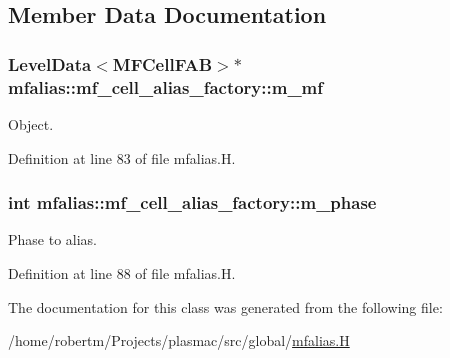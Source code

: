 \subsection{Member Data Documentation}
\subsubsection[{\texorpdfstring{m\+\_\+mf}{m_mf}}]{\setlength{\rightskip}{0pt plus 5cm}Level\+Data$<$M\+F\+Cell\+F\+AB$>$$\ast$ mfalias\+::mf\+\_\+cell\+\_\+alias\+\_\+factory\+::m\+\_\+mf\hspace{0.3cm}{\ttfamily [private]}}\hypertarget{classmfalias_1_1mf__cell__alias__factory_a902714c5872780711530819797b6e82c}{}\label{classmfalias_1_1mf__cell__alias__factory_a902714c5872780711530819797b6e82c}


Object. 



Definition at line 83 of file mfalias.\+H.

\subsubsection[{\texorpdfstring{m\+\_\+phase}{m_phase}}]{\setlength{\rightskip}{0pt plus 5cm}int mfalias\+::mf\+\_\+cell\+\_\+alias\+\_\+factory\+::m\+\_\+phase\hspace{0.3cm}{\ttfamily [private]}}\hypertarget{classmfalias_1_1mf__cell__alias__factory_afd7fb3dcdfd16ca15f52fec542b32c43}{}\label{classmfalias_1_1mf__cell__alias__factory_afd7fb3dcdfd16ca15f52fec542b32c43}


Phase to alias. 



Definition at line 88 of file mfalias.\+H.



The documentation for this class was generated from the following file\+:\begin{DoxyCompactItemize}
\item 
/home/robertm/\+Projects/plasmac/src/global/\hyperlink{mfalias_8H}{mfalias.\+H}\end{DoxyCompactItemize}
